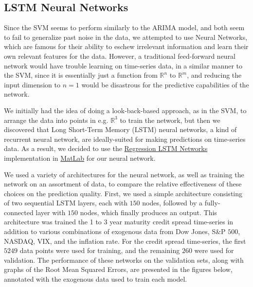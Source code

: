 \documentclass[12pt]{article}
\begin{document}
    \subsection{LSTM Neural Networks}
    Since the SVM seems to perform similarly to the ARIMA model, and both seem to fail to generalize past noise in the data, we attempted to use Neural Networks,
    which are famous for their ability to eschew irrelevant information and learn their own relevant features for the data.
    However, a traditional feed-forward neural network would have trouble learning on time-series data, in a similar manner to the SVM,
    since it is essentially just a function from $\mathbb{R}^n$ to $\mathbb{R}^m$,
    and reducing the input dimension to $n = 1$ would be disastrous for the predictive capabilities of the network.

    We initially had the idea of doing a look-back-based approach, as in the SVM,
    to arrange the data into points in e.g. $\mathbb{R}^3$ to train the network,
    but then we discovered that Long Short-Term Memory (LSTM) neural networks, a kind of recurrent neural network,
    are ideally-suited for making predictions on time-series data.
    As a result, we decided to use the \href{https://www.mathworks.com/help/deeplearning/ug/long-short-term-memory-networks.html}{Regression LSTM Networks} implementation in
    \href{https://www.mathworks.com/products/matlab.html}{MatLab} for our neural network.

    We used a variety of architectures for the neural network, as well as training the network on an assortment of data,
    to compare the relative effectiveness of these choices on the prediction quality.
    First, we used a simple architecture consisting of two sequential LSTM layers, each with $150$ nodes, followed by a fully-connected layer with $150$ nodes,
    which finally produces an output. This architecture was trained the 1 to 3 year maturity credit spread time-series
    in addition to various combinations of exogenous data from Dow Jones, S\&P $500$, NASDAQ, VIX, and the inflation rate.
    For the credit spread time-series, the first $5249$ data points were used for training, and the remaining $260$ were used for validation.
    The performance of these networks on the validation sets, along with graphs of the Root Mean Squared Errors, are presented in the figures below,
    annotated with the exogenous data used to train each model.
\end{document}

